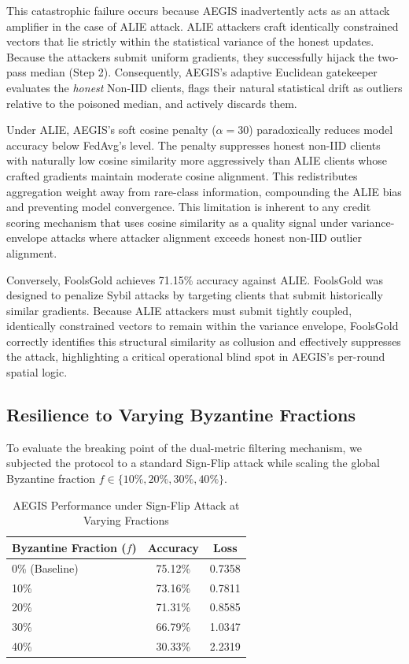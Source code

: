 \documentclass[10pt, conference]{IEEEtran}
\begin{document}
This catastrophic failure occurs because AEGIS inadvertently acts as an attack amplifier in the case of ALIE attack. ALIE attackers craft identically constrained vectors that lie strictly within the statistical variance of the honest updates. Because the attackers submit uniform gradients, they successfully hijack the two-pass median (Step 2). Consequently, AEGIS's adaptive Euclidean gatekeeper evaluates the \textit{honest} Non-IID clients, flags their natural statistical drift as outliers relative to the poisoned median, and actively discards them.

Under ALIE, AEGIS's soft cosine penalty ($\alpha = 30$) paradoxically reduces model accuracy below FedAvg's level. The penalty suppresses honest non-IID clients with naturally low cosine similarity more aggressively than ALIE clients whose crafted gradients maintain moderate cosine alignment. This redistributes aggregation weight away from rare-class information, compounding the ALIE bias and preventing model convergence. This limitation is inherent to any credit scoring mechanism that uses cosine similarity as a quality signal under variance-envelope attacks where attacker alignment exceeds honest non-IID outlier alignment.

Conversely, FoolsGold achieves 71.15\% accuracy against ALIE. FoolsGold was designed to penalize Sybil attacks by targeting clients that submit historically similar gradients. Because ALIE attackers must submit tightly coupled, identically constrained vectors to remain within the variance envelope, FoolsGold correctly identifies this structural similarity as collusion and effectively suppresses the attack, highlighting a critical operational blind spot in AEGIS's per-round spatial logic.

\subsection{Resilience to Varying Byzantine Fractions}
To evaluate the breaking point of the dual-metric filtering mechanism, we subjected the protocol to a standard Sign-Flip attack while scaling the global Byzantine fraction $f \in \{10\%, 20\%, 30\%, 40\%\}$.

\begin{table}[htbp]
\centering
\caption{AEGIS Performance under Sign-Flip Attack at Varying Fractions}
\begin{tabular}{@{}lcc@{}}
\toprule
\textbf{Byzantine Fraction ($f$)} & \textbf{Accuracy} & \textbf{Loss} \\ \midrule
0\% (Baseline) & 75.12\% & 0.7358 \\
10\% & 73.16\% & 0.7811 \\
20\% & 71.31\% & 0.8585 \\
30\% & 66.79\% & 1.0347 \\
40\% & 30.33\% & 2.2319 \\ \bottomrule
\end{tabular}
\label{tab:fractions}
\end{table}
\end{document}

